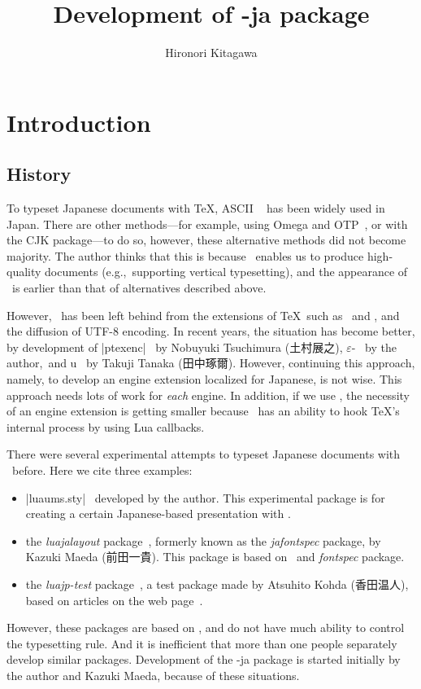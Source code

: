 \documentclass{ajt}
\title{Development of \LuaTeX-ja package}
\author[北川 弘典]{Hironori Kitagawa}
\begin{document}
\maketitle

\section{Introduction}
\subsection{History}
To typeset Japanese documents with \TeX, ASCII \pTeX~\cite{ptex} has
been widely used in Japan.  There are other methods---for example, using
Omega and OTP~\cite{omega}, or with the CJK package---to do so, however,
these alternative methods did not become majority.  The author thinks
that this is because \pTeX\ enables us to produce high-quality documents
(e.g.,~supporting vertical typesetting), and the appearance of \pTeX\ is
earlier than that of alternatives described above.

However, \pTeX\ has been left behind from the extensions of \TeX\ such
as \eTeX\ and \pdfTeX, and the diffusion of UTF-8 encoding.  In recent
years, the situation has become better, by development of
|ptexenc|~\cite{ptexenc} by Nobuyuki Tsuchimura (\hbox{土村展之}),
$\varepsilon$-\pTeX~\cite{eptex} by the author,~and u\pTeX~\cite{uptex}
by Takuji Tanaka (田中琢爾). However, continuing this approach, namely,
to develop an engine extension localized for Japanese, is not wise. This
approach needs lots of work for \emph{each} engine. In addition, if we
use \LuaTeX, the necessity of an engine extension is getting smaller
because \LuaTeX\ has an ability to hook \TeX's internal process by using
Lua callbacks.


There were several experimental attempts to typeset
Japanese documents with \LuaTeX\ before. Here we cite three examples:
\begin{itemize}
\item |luaums.sty|~\cite{luaums} developed by the author. This
      experimental package is for creating a certain Japanese-based presentation
      with \LuaTeX.
\item the \emph{luajalayout} package~\cite{luajalayout}, formerly known as the
      \emph{jafontspec} package, by Kazuki Maeda (前田一貴). This package is based on
      \LaTeXe\ and \emph{fontspec} package.
\item the \emph{luajp-test} package~\cite{luajp-test}, a test package made by
      Atsuhito Kohda (香田温人), based on articles on the web page~\cite{joylua}.
\end{itemize}
However, these packages are based on \LaTeXe, and do not have much
ability to control the typesetting rule. And it is inefficient that more
than one people separately develop similar packages.  Development of the
\LuaTeX-ja package is started initially by the author and Kazuki Maeda, because of
these situations.
\end{document}

